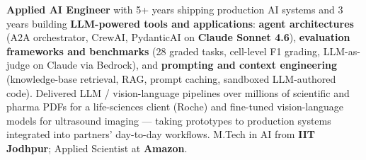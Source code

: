 \documentclass[letter,10pt]{article}
\begin{document}

\textbf{Applied AI Engineer} with 5+ years shipping production AI systems and 3 years building \textbf{LLM-powered tools and applications}: \textbf{agent architectures} (A2A orchestrator, CrewAI, PydanticAI on \textbf{Claude Sonnet 4.6}), \textbf{evaluation frameworks and benchmarks} (28 graded tasks, cell-level F1 grading, LLM-as-judge on Claude via Bedrock), and \textbf{prompting and context engineering} (knowledge-base retrieval, RAG, prompt caching, sandboxed LLM-authored code).
Delivered LLM / vision-language pipelines over millions of scientific and pharma PDFs for a life-sciences client (Roche) and fine-tuned vision-language models for ultrasound imaging --- taking prototypes to production systems integrated into partners' day-to-day workflows.
M.Tech in AI from \textbf{IIT Jodhpur}; Applied Scientist at \textbf{Amazon}.
\end{document}
